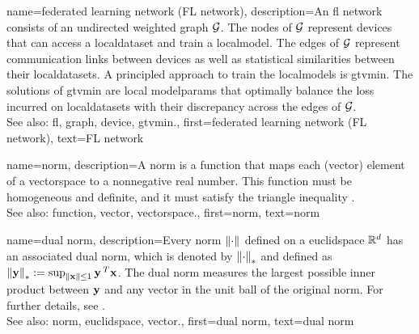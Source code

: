 {name={federated learning network (FL network)},
	description={An \gls{fl} network consists of 
		an undirected weighted \gls{graph} $\mathcal{G}$. The nodes of $\mathcal{G}$ represent \glspl{device} 
		that can access a \gls{localdataset} and train a \gls{localmodel}. The edges of $\mathcal{G}$ represent 
		communication links between \glspl{device} as well as statistical similarities between their \glspl{localdataset}. 
		A principled approach to train the \glspl{localmodel} is \gls{gtvmin}. The solutions of \gls{gtvmin} are local 
		\glspl{modelparam} that optimally balance the \gls{loss} incurred on \glspl{localdataset} with their \gls{discrepancy} 
		across the edges of $\mathcal{G}$.
	    			\\ 
		See also: \gls{fl}, \gls{graph}, \gls{device}, \gls{gtvmin}.},
	first={federated learning network (FL network)},
	text={FL network} 
}

{name={norm},
	description={A norm is a \gls{function} that maps each (\gls{vector}) element 
		of a \gls{vectorspace} to a nonnegative real number. This \gls{function} must be 
		homogeneous and definite, and it must satisfy the triangle inequality \cite{HornMatAnalysis}.
		\\
		See also: \gls{function}, \gls{vector}, \gls{vectorspace}.},
	first={norm},
	text={norm} 
}

{name={dual norm},
	description={Every \gls{norm} $\left\Vert {\cdot} \right\Vert_{}$ defined on a \gls{euclidspace} $\mathbb{R}^{d}$ 
		has an associated dual \gls{norm}, which is denoted by $\left\Vert {\cdot} \right\Vert_{*}$ and defined as 
		$\left\Vert {{\bf y}} \right\Vert_{*} := \sup_{\Vert {{\bf x}} \Vert{} \le 1} {\bf y}\,^{T} {\bf x}$. 
		The dual \gls{norm} measures the largest possible inner product between ${\bf y}$ 
		and any \gls{vector} in the unit ball of the original \gls{norm}. For further details, see 
		\cite[Sec.~A.1.6]{BoydConvexBook}.
					\\ 
		See also: \gls{norm}, \gls{euclidspace}, \gls{vector}.},
	first={dual norm},
	text={dual norm}
}

